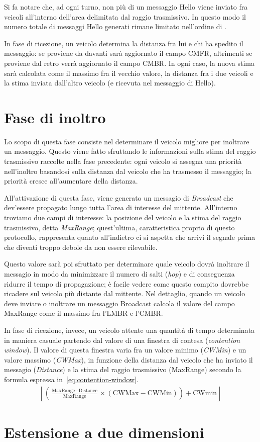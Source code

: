 Si fa notare che, ad ogni turno, non più di un messaggio Hello viene inviato fra veicoli all'interno dell'area delimitata dal raggio trasmissivo.
In questo modo il numero totale di messaggi Hello generati rimane limitato nell'ordine di .

In fase di ricezione, un veicolo determina la distanza fra lui e chi ha spedito il messaggio: se proviene da davanti sarà aggiornato il campo CMFR,
altrimenti se proviene dal retro verrà aggiornato il campo CMBR.
In ogni caso, la nuova stima sarà calcolata come il massimo fra il vecchio valore, la distanza fra i due veicoli e la stima inviata dall'altro veicolo
(e ricevuta nel messaggio di Hello).
%
\section{Fase di inoltro}
Lo scopo di questa fase consiste nel determinare il veicolo migliore per inoltrare un messaggio.
Questo viene fatto sfruttando le informazioni sulla stima del raggio trasmissivo raccolte nella fase precedente:
ogni veicolo si assegna una priorità nell'inoltro basandosi sulla distanza dal veicolo che ha trasmesso il messaggio;
la priorità cresce all'aumentare della distanza.

All'attivazione di questa fase, viene generato un messagio di \textit{Broadcast} che dev'essere propagato lungo tutta l'area di interesse del mittente.
All'interno troviamo due campi di interesse: la posizione del veicolo e la stima del raggio trasmissivo, detta \textit{MaxRange}; quest'ultima, caratteristica proprio di questo protocollo,
rappresenta quanto all'indietro ci si aspetta che arrivi il segnale prima che diventi troppo debole da non essere rilevabile.

Questo valore sarà poi sfruttato per determinare quale veicolo dovrà inoltrare il messagio in modo da minimizzare il numero di salti (\textit{hop}) e di conseguenza
ridurre il tempo di propagazione;
è facile vedere come questo compito dovrebbe ricadere sul veicolo più distante dal mittente. %
Nel dettaglio, quando un veicolo deve inviare o inoltrare un messaggio Broadcast calcola il valore del campo MaxRange come il massimo fra l'LMBR e l'CMBR.

In fase di ricezione, invece, un veicolo attente una quantità di tempo determinata in maniera casuale partendo dal valore di una finestra di contesa (\textit{contention window}).
Il valore di questa finestra varia fra un valore minimo (\textit{CWMin}) e un valore massimo (\textit{CWMax}), in funzione della distanza dal veicolo che ha inviato il messagio (\textit{Distance})
e la stima del raggio trasmissivo (MaxRange) secondo la formula espressa in~\ref{eq:contention-window}.
\begin{gather}\label{eq:contention-window}
	\left\lfloor \left( \frac{\text{MaxRange} - \text{Distance}}{\text{MaxRange}} \times (\text{CWMax} - \text{CWMin}) \right) + \text{CWmin}  \right\rfloor
\end{gather}
%
\section{Estensione a due dimensioni}

